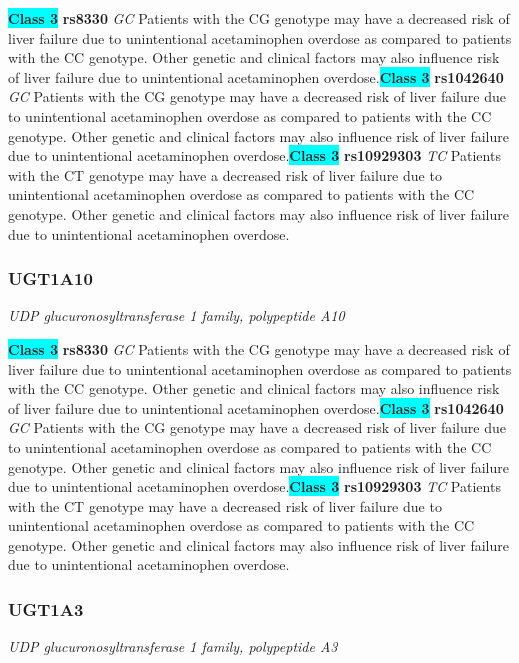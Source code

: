 \documentclass{report}
\begin{document}
\textbf{\colorbox{cyan} {Class 3}} \textbf{ rs8330 } \textit{ GC }
Patients with the CG genotype may have a decreased risk of liver failure due to unintentional acetaminophen overdose as compared to patients with the CC genotype. Other genetic and clinical factors may also influence risk of liver failure due to unintentional acetaminophen overdose.\newline\textbf{\colorbox{cyan} {Class 3}} \textbf{ rs1042640 } \textit{ GC }
Patients with the CG genotype may have a decreased risk of liver failure due to unintentional acetaminophen overdose as compared to patients with the CC genotype. Other genetic and clinical factors may also influence risk of liver failure due to unintentional acetaminophen overdose.\newline\textbf{\colorbox{cyan} {Class 3}} \textbf{ rs10929303 } \textit{ TC }
Patients with the CT genotype may have a decreased risk of liver failure due to unintentional acetaminophen overdose as compared to patients with the CC genotype. Other genetic and clinical factors may also influence risk of liver failure due to unintentional acetaminophen overdose.\newline\subsubsection{ UGT1A10 }
\textit{ UDP glucuronosyltransferase 1 family, polypeptide A10 }

\textbf{\colorbox{cyan} {Class 3}} \textbf{ rs8330 } \textit{ GC }
Patients with the CG genotype may have a decreased risk of liver failure due to unintentional acetaminophen overdose as compared to patients with the CC genotype. Other genetic and clinical factors may also influence risk of liver failure due to unintentional acetaminophen overdose.\newline\textbf{\colorbox{cyan} {Class 3}} \textbf{ rs1042640 } \textit{ GC }
Patients with the CG genotype may have a decreased risk of liver failure due to unintentional acetaminophen overdose as compared to patients with the CC genotype. Other genetic and clinical factors may also influence risk of liver failure due to unintentional acetaminophen overdose.\newline\textbf{\colorbox{cyan} {Class 3}} \textbf{ rs10929303 } \textit{ TC }
Patients with the CT genotype may have a decreased risk of liver failure due to unintentional acetaminophen overdose as compared to patients with the CC genotype. Other genetic and clinical factors may also influence risk of liver failure due to unintentional acetaminophen overdose.\newline\subsubsection{ UGT1A3 }
\textit{ UDP glucuronosyltransferase 1 family, polypeptide A3 }
\end{document}
